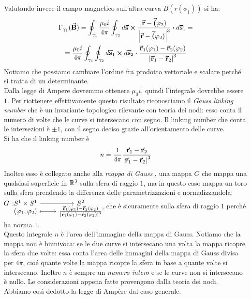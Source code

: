 Valutando invece il campo magnetico sull'altra curva $B(r(\phi_1))$ si ha:
\begin{gather*}
	\Gamma_{\gamma_1}(\vba B)= \oint_{\gamma_1}\frac{\mu_0i}{4\pi} \oint_{\gamma_2} d\vba s \cross \frac{\vba r - \vba (\phi_2)}{\abs{\vba r - \vba (\phi_2)}^3} \vdot d\vba{s}_1=\\
	=\frac{\mu_0i}{4\pi}\oint_{\gamma_1} \oint_{\gamma_2} d\vba{s}_1\cross d\vba{s}_2 \vdot \frac{\vba r_1(\phi_1) - \vba r_2 (\phi_2)}{\abs{\vba r_1 - \vba r_2}^3}	
\end{gather*}
Notiamo che possiamo cambiare l'ordine fra prodotto vettoriale e scalare perché si tratta di un determinante.\\
Dalla legge di Ampere dovremmo ottenere $\mu_0 i$, quindi l'integrale dovrebbe essere $1$. Per riottenere effettivamente questo risultato riconosciamo il \textit{Gauss linking number}   che è un invariante topologico rilevante con teoria dei nodi: esso conta il numero di volte che le curve si intersecano con segno. %
Il linking number che conta le intersezioni è $\pm 1$, con il segno deciso grazie all'orientamento delle curve.\\
Si ha che il linking number è 
\begin{equation*}
	n=\frac{1}{4\pi} \frac{\vb*{\va{r}}_1 - \vb*{\va{r}}_2 }{\abs{\vb*{\va{r}}_1 - \vb*{\va{r}}_2}^3}	
\end{equation*}
Inoltre esso è collegato anche alla \textit{mappa di Gauss} , una mappa $G$ che mappa una qualsiasi superficie in $\mathbb{R}^3$ sulla sfera di raggio $1$, ma in questo caso mappa un toro sulla sfera prendendo la differenza delle parametrizzazioni e normalizzandola:
$\funztot[G] {S^1\times S^1} {S^2} {(\phi_1, \phi_2)}{ \frac{\vba r_1(\phi_1) - \vba r_2 (\phi_2)}{\abs{\vba r_1(\phi_1) - \vba r_2(\phi_2)}^3}	}$, che è sicuramente sulla sfera di raggio $1$ perché ha norma $1$. \\
Questo integrale $n$ è l'area dell'immagine della mappa di Gauss. Notiamo che la mappa non è biunivoca: se le due curve si intersecano una volta la mappa ricopre la sfera due volte: essa conta l'area delle immagini della mappa di Gauss divisa per $4\pi$, cioé quante volte la mappa ricopre la sfera in base a quante volte si intersecano. Inoltre $n$ è sempre un \textit{numero intero} e se le curve non si intersecano è nullo. Le considerazioni appena fatte provengono dalla teoria dei nodi. \\
Abbiamo così dedotto la legge di Ampère dal caso generale.


